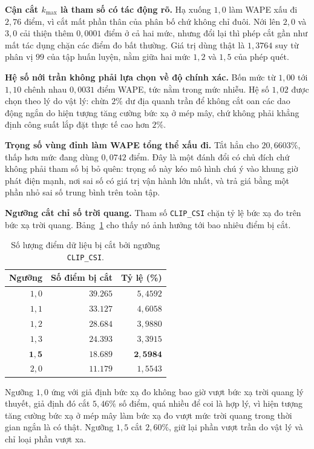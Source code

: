 \documentclass[12pt, a4paper]{report}
\begin{document}
\textbf{Cận cắt $k_{\max}$ là tham số có tác động rõ.} Hạ xuống $1{,}0$ làm WAPE xấu đi
$2{,}76$ điểm, vì cắt mất phần thân của phân bố chứ không chỉ đuôi. Nới lên $2{,}0$ và $3{,}0$
cải thiện thêm $0{,}0001$ điểm ở cả hai mức, nhưng đổi lại thì phép cắt gần như mất tác dụng chặn
các điểm đo bất thường. Giá trị dùng thật là $1{,}3764$ suy từ phân vị $99$ của tập huấn
luyện, nằm giữa hai mức $1{,}2$ và $1{,}5$ của phép quét.

\textbf{Hệ số nới trần không phải lựa chọn về độ chính xác.} Bốn mức từ $1{,}00$ tới $1{,}10$
chênh nhau $0{,}0031$ điểm WAPE, tức nằm trong mức nhiễu. Hệ số $1{,}02$ được chọn theo lý do
vật lý: chừa $2\%$ dư địa quanh trần để không cắt oan các dao động ngắn do hiện tượng tăng
cường bức xạ ở mép mây, chứ không phải khẳng định công suất lắp đặt thực tế cao hơn $2\%$.

\textbf{Trọng số vùng đỉnh làm WAPE tổng thể xấu đi.} Tắt hẳn cho $20{,}6603\%$, thấp hơn mức
đang dùng $0{,}0742$ điểm. Đây là một đánh đổi có chủ đích chứ không phải tham số bị bỏ quên:
trọng số này kéo mô hình chú ý vào khung giờ phát điện mạnh, nơi sai số có giá trị vận hành
lớn nhất, và trả giá bằng một phần nhỏ sai số trung bình trên toàn tập.

\textbf{Ngưỡng cắt chỉ số trời quang.} Tham số \texttt{CLIP\_CSI} chặn tỷ lệ bức xạ đo trên bức xạ
trời quang. Bảng~\ref{tab:clip_csi} cho thấy nó ảnh hưởng tới bao nhiêu điểm bị cắt.

\begin{table}[htbp]
\centering
\caption{Số lượng điểm dữ liệu bị cắt bởi ngưỡng \texttt{CLIP\_CSI}.}
\label{tab:clip_csi}
\small
\begin{tabular}{r r r}
\toprule
\textbf{Ngưỡng} & \textbf{Số điểm bị cắt} & \textbf{Tỷ lệ (\%)} \\
\midrule
$1{,}0$ & $39.265$ & $5{,}4592$ \\
$1{,}1$ & $33.127$ & $4{,}6058$ \\
$1{,}2$ & $28.684$ & $3{,}9880$ \\
$1{,}3$ & $24.393$ & $3{,}3915$ \\
$\mathbf{1{,}5}$ & $\mathbf{18.689}$ & $\mathbf{2{,}5984}$ \\
$2{,}0$ & $11.179$ & $1{,}5543$ \\
\bottomrule
\end{tabular}
\end{table}

Ngưỡng $1{,}0$ ứng với giả định bức xạ đo không bao giờ vượt bức xạ trời quang lý thuyết,
giả định đó cắt $5{,}46\%$ số điểm, quá nhiều để coi là hợp lý, vì hiện tượng tăng cường bức
xạ ở mép mây làm bức xạ đo vượt mức trời quang trong thời gian ngắn là có thật. Ngưỡng
$1{,}5$ cắt $2{,}60\%$, giữ lại phần vượt trần do vật lý và chỉ loại phần vượt xa.
\end{document}
